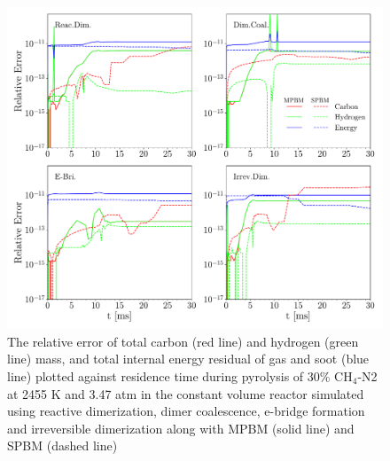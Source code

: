 \begin{figure}[!htbp]
	\centering
	\includegraphics[width=1\textwidth]{Figures/Results/Validation/ConstUV/relerr_constuv.pdf}
	\caption{The relative error of total carbon (red line) and hydrogen (green line) mass, and total internal energy residual of gas and soot (blue line) plotted against residence time during pyrolysis of 30\% $\mathrm{CH_4}$-N2 at 2455 K and 3.47 atm in the constant volume reactor simulated using reactive dimerization, dimer coalescence, e-bridge formation and irreversible dimerization along with MPBM (solid line) and SPBM (dashed line)}
	\label{fig:constuvvalid}
\end{figure}



